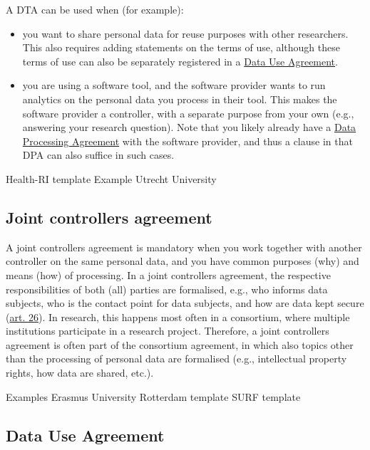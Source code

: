 \documentclass[
]{book}
\providecommand{\tightlist}{%
  \setlength{\itemsep}{0pt}\setlength{\parskip}{0pt}}
\begin{document}
A DTA can be used when (for example):

\begin{itemize}
\tightlist
\item
  you want to share personal data for reuse purposes with other researchers.
  This also requires adding statements on the terms of use, although these terms
  of use can also be separately registered in a \protect\hyperlink{user-agreement}{Data Use Agreement}.
\item
  you are using a software tool, and the software provider wants to run
  analytics on the personal data you process in their tool. This makes the
  software provider a controller, with a separate purpose from your own (e.g.,
  answering your research question). Note that you likely already have a
  \protect\hyperlink{data-processing-agreement}{Data Processing Agreement} with the
  software provider, and thus a clause in that DPA can also suffice in such cases.
\end{itemize}

Health-RI template
Example Utrecht University

\hypertarget{joint-controller-agreement}{%
\subsection{Joint controllers agreement}\label{joint-controller-agreement}}

A joint controllers agreement is mandatory when you work together with another
controller on the same personal data, and you have common purposes (why) and
means (how) of processing. In a joint controllers agreement, the respective
responsibilities of both (all) parties are formalised, e.g., who informs data
subjects, who is the contact point for data subjects, and how are data kept
secure (\href{https://gdpr-info.eu/art-26-gdpr/}{art. 26}).
In research, this happens most often in a consortium, where multiple institutions
participate in a research project. Therefore, a joint controllers agreement is
often part of the consortium agreement, in which also topics other than the
processing of personal data are formalised (e.g., intellectual property rights,
how data are shared, etc.).

Examples
Erasmus University Rotterdam template
SURF template

\hypertarget{user-agreement}{%
\subsection{Data Use Agreement}\label{user-agreement}}
\end{document}
